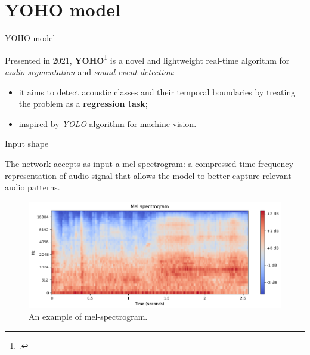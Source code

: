 

\section[YOHO model]{YOHO model}

	\begin{frame}{YOHO model}

		Presented in 2021, \textbf{YOHO}\footcite{Venkatesh_2022} is a novel and lightweight real-time algorithm for
		\textit{audio segmentation} and \textit{sound event detection}:

		\begin{itemize}
			\item {it aims to detect acoustic classes and their temporal boundaries by treating the problem as a
				\textbf{regression task};}
			\item inspired by \textit{YOLO} algorithm for machine vision.
		\end{itemize}

	\end{frame}

	\begin{frame}{Input shape}

		The network accepts as input a mel-spectrogram: a compressed time-frequency representation of audio signal that
		allows the model to better capture relevant audio patterns.

		\begin{figure}
			\centering
			\includegraphics[width=.75\textwidth]{images/spectrogram.png}
			\caption{An example of mel-spectrogram.}
			\label{fig:spectogram}
		\end{figure}

	\end{frame}

